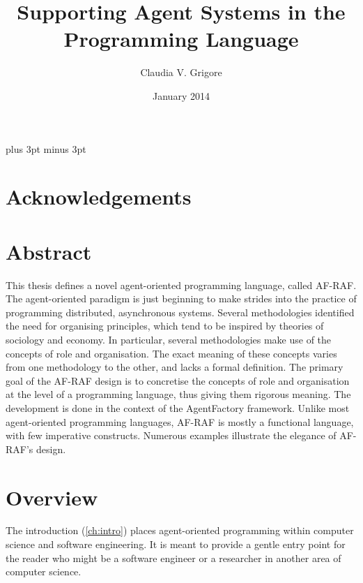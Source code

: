 \documentclass[a4paper,12pt,oneside,fleqn]{book} %
\newcommand{\rg}[1]{\marginpar{\tiny\raggedright\textcolor{blue}{\bf rg:} #1}}
\begin{document}
\overfullrule=5pt   %
\title{Supporting Agent Systems in the Programming Language} %
\author{Claudia V. Grigore}
\date{January 2014}
\maketitle

\tableofcontents
\listoffigures
\listoftables
\baselineskip=21.75pt
\parskip=3pt plus 3pt minus 3pt
\chapter*{Acknowledgements} %


\chapter*{Abstract} %

This thesis defines a novel agent-oriented programming language, called
AF-RAF\null.  The agent-oriented paradigm is just beginning to make strides
into the practice of programming distributed, asynchronous systems.
Several methodologies identified the need for organising principles, which
tend to be inspired by theories of sociology and economy.  In particular,
several methodologies make use of the concepts of role and organisation.
The exact meaning of these concepts varies from one methodology to the
other, and lacks a formal definition.  The primary goal of the AF-RAF
design is to concretise the concepts of role and organisation at the level
of a programming language, thus giving them rigorous meaning. The
development is done in the context of the AgentFactory framework.  Unlike
most agent-oriented programming languages, AF-RAF is mostly a functional
language, with few imperative constructs.  Numerous examples illustrate the
elegance of AF-RAF's design.



\chapter*{Overview} %

The introduction (\autoref{ch:intro}) places agent-oriented programming
within computer science and software engineering. It is meant to provide a
gentle entry point for the reader who might be a software engineer or a
researcher in another area of computer science.
\end{document}
